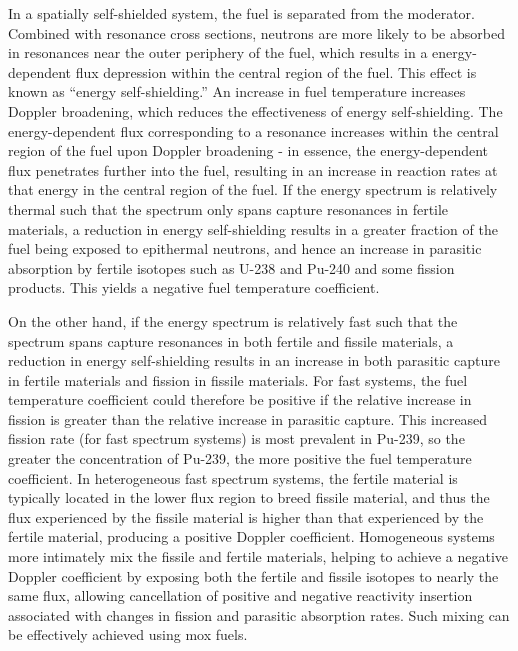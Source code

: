 In a spatially self-shielded system, the fuel is separated from the moderator. Combined with resonance cross sections, neutrons are more likely to be absorbed in resonances near the outer periphery of the fuel, which results in a energy-dependent flux depression within the central region of the fuel. This effect is known as ``energy self-shielding.'' An increase in fuel temperature increases Doppler broadening, which reduces the effectiveness of energy self-shielding. The energy-dependent flux corresponding to a resonance increases within the central region of the fuel upon Doppler broadening - in essence, the energy-dependent flux penetrates further into the fuel, resulting in an increase in reaction rates at that energy in the central region of the fuel. If the energy spectrum is relatively thermal such that the spectrum only spans capture resonances in fertile materials, a reduction in energy self-shielding results in a greater fraction of the fuel being exposed to epithermal neutrons, and hence an increase in parasitic absorption by fertile isotopes such as U-238 and Pu-240 and some fission products. This yields a negative fuel temperature coefficient. %

On the other hand, if the energy spectrum is relatively fast such that the spectrum spans capture resonances in both fertile and fissile materials, a reduction in energy self-shielding results in an increase in both parasitic capture in fertile materials and fission in fissile materials. For fast systems, the fuel temperature coefficient could therefore be positive if the relative increase in fission is greater than the relative increase in parasitic capture. This increased fission rate (for fast spectrum systems) is most prevalent in Pu-239, so the greater the concentration of Pu-239, the more positive the fuel temperature coefficient. In heterogeneous fast spectrum systems, the fertile material is typically located in the lower flux region to breed fissile material, and thus the flux experienced by the fissile material is higher than that experienced by the fertile material, producing a positive Doppler coefficient. Homogeneous systems more intimately mix the fissile and fertile materials, helping to achieve a negative Doppler coefficient by exposing both the fertile and fissile isotopes to nearly the same flux, allowing cancellation of positive and negative reactivity insertion associated with changes in fission and parasitic absorption rates. Such mixing can be effectively achieved using \gls{mox} fuels. 

